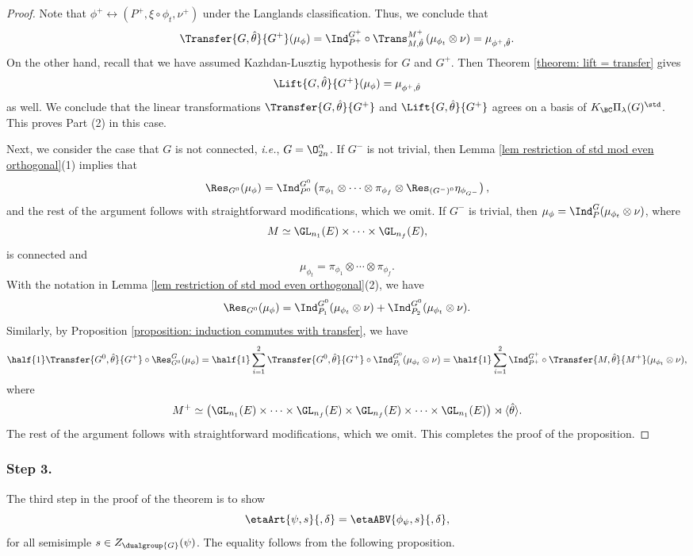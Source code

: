 \documentclass[11pt,letterpaper]{amsart}
\numberwithin{equation}{section}
\begin{document}
\begin{proof}
Note that $\phi^+ \leftrightarrow (P^+, \xi\circ \phi_t, \nu^+)$ under the Langlands classification. Thus, we conclude that 
 \[\Transfer{G,\hat{\theta}}{ G^+}(\mu_{\phi})= \Ind_{P^+}^{G^+}  \circ \Trans_{M,\hat{\theta}}^{M^+} \left( \mu_{\phi_t} \otimes \nu \right)= \mu_{\phi^+,\hat{\theta}}. \]
 On the other hand, recall that we have assumed Kazhdan-Lusztig hypothesis for $G$ and $G^+$. Then Theorem \ref{theorem: lift = transfer} gives 
 \[\Lift{G,\hat{\theta}}{ G^+}(\mu_{\phi}) =  \mu_{\phi^+,\hat{\theta}} \]
 as well. We conclude that the linear transformations $\Transfer{G,\hat{\theta}}{ G^+}$ and  $\Lift{G,\hat{\theta}}{ G^+}$ agrees on a basis of $K_{\BC}\Pi_{\lambda}(G)^{\std}$. This proves Part (2) in this case.

Next, we consider the case that $G$ is not connected, {\it i.e.}, $G= \O_{2n}^{\alpha}$. If $G^-$ is not trivial, then Lemma \ref{lem restriction of std mod even orthogonal}(1) implies that 
\[ \Res_{G^0}(\mu_{\phi})= \Ind_{P^0}^{G^0} \left( \pi_{\phi_1} \otimes \cdots \otimes \pi_{\phi_f} \otimes   \Res_{(G^-)^0}\eta_{\phi_{G^-}} \right),\]
and the rest of the argument follows with straightforward modifications, which we omit. If $G^-$ is trivial, then  $\mu_{\phi}= \Ind_P^G (\mu_{\phi_t}\otimes \nu)$, where
\[ M \simeq \GL_{n_1}(E) \times \cdots \times \GL_{n_f}(E),\]
is connected and
\[\mu_{\phi_t}= \pi_{\phi_1} \otimes \cdots \otimes \pi_{\phi_f}.\]
With the notation in Lemma \ref{lem restriction of std mod even orthogonal}(2), we have 
\[ \Res_{G^0}(\mu_{\phi})= \Ind_{P_1}^{G^0}(\mu_{\phi_t} \otimes \nu) + \Ind_{P_2}^{G^0}(\mu_{\phi_t} \otimes \nu).\]
Similarly, by Proposition \ref{proposition: induction commutes with transfer}, we have 
\[ \half{1}\Transfer{G^0,\hat{\theta}}{G^+} \circ \Res^{G}_{G^0}(\mu_{\phi}) = \half{1}\sum_{i=1}^2 \Transfer{G^0,\hat{\theta}}{G^+} \circ \Ind_{P_i}^{G^0} (\mu_{\phi_t} \otimes \nu)=   \half{1}\sum_{i=1}^2 \Ind_{P^+}^{G^+} \circ \Transfer{ M,\hat{\theta}}{M^+}  (\mu_{\phi_t} \otimes \nu), \]
where 
\[ M^+ \simeq \big{(}\GL_{n_1}(E) \times \cdots \times \GL_{n_f}(E) \times \GL_{n_f}(E) \times \cdots \times \GL_{n_1}(E)  \big{)} \rtimes \langle \hat{\theta} \rangle.\]
The rest of the argument follows with straightforward modifications, which we omit. This completes the proof of the proposition.
\end{proof}

\subsubsection{\bf Step 3.}\label{sec step 3}
The third step in the proof of the theorem is to show
\begin{equation}\label{equation: step 3, a}
    \etaArt{\psi,s}{,\delta}
    =
    \etaABV{\phi_\psi,s}{,\delta},
\end{equation}
for all semisimple $s\in Z_{\dualgroup{G}}(\psi)$. The equality follows from the following proposition.
\end{document}
